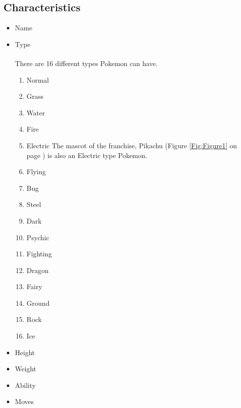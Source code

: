 \documentclass{article}
\begin{document}
\subsection{Characteristics}
\begin{itemize}
\item Name
\item Type \newline
\paragraph{}
There are 16 different types Pokemon can have.
\begin{enumerate}
\item Normal
\item Grass
\item Water
\item Fire
\item Electric\newline
The mascot of the franchise, Pikachu (Figure \ref{Fig:Figure1} on page \pageref{Fig:Figure1}) is also an Electric type Pokemon.
\item Flying
\item Bug
\item Steel
\item Dark
\item Psychic
\item Fighting
\item Dragon
\item Fairy
\item Ground
\item Rock
\item Ice
\end{enumerate}
\item Height
\item Weight
\item Ability
\item Moves
\end{itemize}
\end{document}

